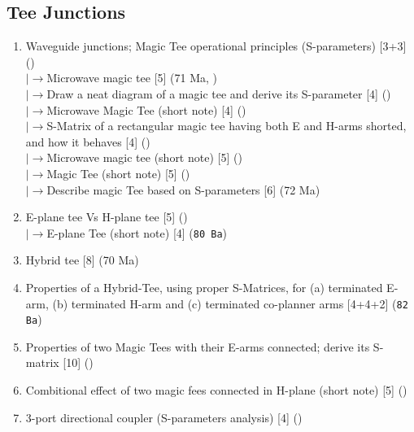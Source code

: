 \documentclass[12pt]{article}
\newcommand{\lb}{\\$\left|\rightarrow\right.$}
\begin{document}
  \subsection{Tee Junctions}
    \begin{enumerate}[topsep=0pt, noitemsep]
      \item Waveguide junctions; Magic Tee operational principles (S-parameters) \hfill [3+3] ()
        \lb Microwave magic tee \hfill [5] (71 Ma, )
        \lb Draw a neat diagram of a magic tee and derive its S-parameter \hfill [4] ()
        \lb Microwave Magic Tee (short note) \hfill [4] ()
        \lb S-Matrix of a rectangular magic tee having both E and H-arms shorted, and how it behaves \hfill [4] ()
        \lb Microwave magic tee (short note) \hfill [5] ()
        \lb Magic Tee (short note) \hfill [5] ()
        \lb Describe magic Tee based on S-parameters \hfill [6] (72 Ma)
      \item E-plane tee Vs H-plane tee \hfill [5] ()
        \lb E-plane Tee (short note) \hfill [4] (\texttt{80 Ba})
      \item Hybrid tee \hfill [8] (70 Ma)
      \item Properties of a Hybrid-Tee, using proper S-Matrices, for (a) terminated E-arm, (b) terminated H-arm and (c) terminated co-planner arms \hfill [4+4+2] (\texttt{82 Ba})
      \item Properties of two Magic Tees with their E-arms connected; derive its S-matrix \hfill [10] ()
      \item Combitional effect of two magic fees connected in H-plane (short note) \hfill [5] ()
      \item 3-port directional coupler (S-parameters analysis) \hfill [4] ()
    \end{enumerate}
\end{document}
